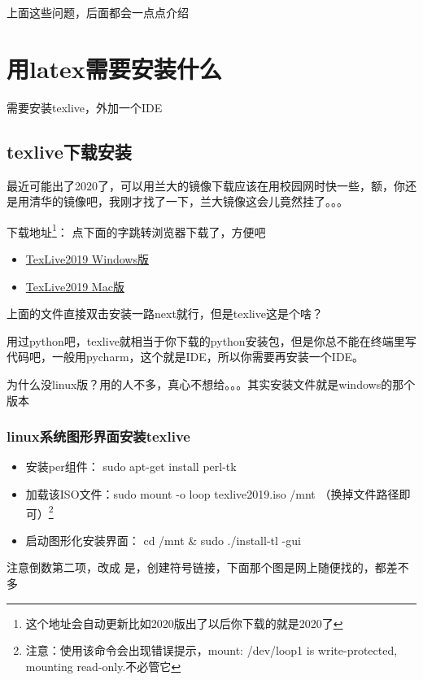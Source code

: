 \documentclass[AutoFakeBold]{LZUThesis2007}
\begin{document}
上面这些问题，后面都会一点点介绍

\section{用latex需要安装什么}
需要安装texlive，外加一个IDE

\subsection{texlive下载安装}
最近可能出了2020了，可以用兰大的镜像下载应该在用校园网时快一些，额，你还是用清华的镜像吧，我刚才找了一下，兰大镜像这会儿竟然挂了。。。

下载地址\footnote{这个地址会自动更新比如2020版出了以后你下载的就是2020了}： 点下面的字跳转浏览器下载了，方便吧

\begin{itemize}
	\item \href{https://mirrors.tuna.tsinghua.edu.cn/CTAN/systems/texlive/Images/texlive.iso}{TexLive2019 \quad Windows版}
	\item \href{http://tug.org/cgi-bin/mactex-download/MacTeX.pkg}{TexLive2019 \quad Mac版}
\end{itemize}

上面的文件直接双击安装一路next就行，但是texlive这是个啥？

用过python吧，texlive就相当于你下载的python安装包，但是你总不能在终端里写代码吧，一般用pycharm，这个就是IDE，所以你需要再安装一个IDE。


为什么没linux版？用的人不多，真心不想给。。。其实安装文件就是windows的那个版本

\subsubsection{linux系统图形界面安装texlive} %
\label{ssub:linux图形界面安装方式}

\begin{itemize}
	\item[1. ] 安装per组件： sudo apt-get install perl-tk
	\item[2. ] 加载该ISO文件：sudo mount -o loop texlive2019.iso /mnt （换掉文件路径即可）\footnote{注意：使用该命令会出现错误提示，mount: /dev/loop1 is write-protected, mounting read-only.不必管它}
	\item[3. ]启动图形化安装界面： cd /mnt \& sudo ./install-tl -gui
\end{itemize}

注意倒数第二项，改成 是，创建符号链接，下面那个图是网上随便找的，都差不多
\end{document}
